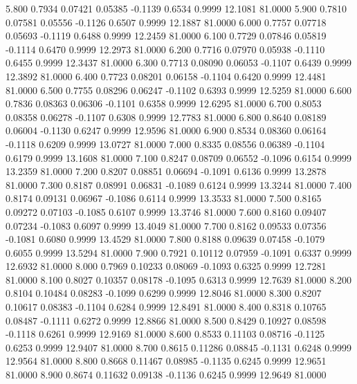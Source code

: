    5.800   0.7934   0.07421   0.05385  -0.1139   0.6534   0.9999  12.1081  81.0000
   5.900   0.7810   0.07581   0.05556  -0.1126   0.6507   0.9999  12.1887  81.0000
   6.000   0.7757   0.07718   0.05693  -0.1119   0.6488   0.9999  12.2459  81.0000
   6.100   0.7729   0.07846   0.05819  -0.1114   0.6470   0.9999  12.2973  81.0000
   6.200   0.7716   0.07970   0.05938  -0.1110   0.6455   0.9999  12.3437  81.0000
   6.300   0.7713   0.08090   0.06053  -0.1107   0.6439   0.9999  12.3892  81.0000
   6.400   0.7723   0.08201   0.06158  -0.1104   0.6420   0.9999  12.4481  81.0000
   6.500   0.7755   0.08296   0.06247  -0.1102   0.6393   0.9999  12.5259  81.0000
   6.600   0.7836   0.08363   0.06306  -0.1101   0.6358   0.9999  12.6295  81.0000
   6.700   0.8053   0.08358   0.06278  -0.1107   0.6308   0.9999  12.7783  81.0000
   6.800   0.8640   0.08189   0.06004  -0.1130   0.6247   0.9999  12.9596  81.0000
   6.900   0.8534   0.08360   0.06164  -0.1118   0.6209   0.9999  13.0727  81.0000
   7.000   0.8335   0.08556   0.06389  -0.1104   0.6179   0.9999  13.1608  81.0000
   7.100   0.8247   0.08709   0.06552  -0.1096   0.6154   0.9999  13.2359  81.0000
   7.200   0.8207   0.08851   0.06694  -0.1091   0.6136   0.9999  13.2878  81.0000
   7.300   0.8187   0.08991   0.06831  -0.1089   0.6124   0.9999  13.3244  81.0000
   7.400   0.8174   0.09131   0.06967  -0.1086   0.6114   0.9999  13.3533  81.0000
   7.500   0.8165   0.09272   0.07103  -0.1085   0.6107   0.9999  13.3746  81.0000
   7.600   0.8160   0.09407   0.07234  -0.1083   0.6097   0.9999  13.4049  81.0000
   7.700   0.8162   0.09533   0.07356  -0.1081   0.6080   0.9999  13.4529  81.0000
   7.800   0.8188   0.09639   0.07458  -0.1079   0.6055   0.9999  13.5294  81.0000
   7.900   0.7921   0.10112   0.07959  -0.1091   0.6337   0.9999  12.6932  81.0000
   8.000   0.7969   0.10233   0.08069  -0.1093   0.6325   0.9999  12.7281  81.0000
   8.100   0.8027   0.10357   0.08178  -0.1095   0.6313   0.9999  12.7639  81.0000
   8.200   0.8104   0.10484   0.08283  -0.1099   0.6299   0.9999  12.8046  81.0000
   8.300   0.8207   0.10617   0.08383  -0.1104   0.6284   0.9999  12.8491  81.0000
   8.400   0.8318   0.10765   0.08487  -0.1111   0.6272   0.9999  12.8866  81.0000
   8.500   0.8429   0.10927   0.08598  -0.1118   0.6261   0.9999  12.9169  81.0000
   8.600   0.8533   0.11103   0.08716  -0.1125   0.6253   0.9999  12.9407  81.0000
   8.700   0.8615   0.11286   0.08845  -0.1131   0.6248   0.9999  12.9564  81.0000
   8.800   0.8668   0.11467   0.08985  -0.1135   0.6245   0.9999  12.9651  81.0000
   8.900   0.8674   0.11632   0.09138  -0.1136   0.6245   0.9999  12.9649  81.0000
